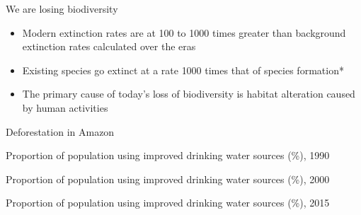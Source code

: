 
{
	\begin{frame}[t]{We are losing biodiversity}
	\begin{itemize}
		\item Modern extinction rates are at \alert{100} to \alert{1000} times greater than background extinction rates calculated over the eras \cite{hambler2004extinction}
		\item Existing species go extinct at a rate \alert{1000} times that of species formation*
		\item The primary cause of today's loss of biodiversity is \alert{habitat alteration caused by human activities}
	\end{itemize}	
\end{frame}
}

{
	\begin{frame}{Deforestation in Amazon}
	\centering
\end{frame}
}

\begin{frame}{Proportion of population using improved drinking water sources (\%), 1990}
\end{frame}

\begin{frame}{Proportion of population using improved drinking water sources (\%), 2000}
\end{frame}

\begin{frame}{Proportion of population using improved drinking water sources (\%), 2015}
\end{frame}

